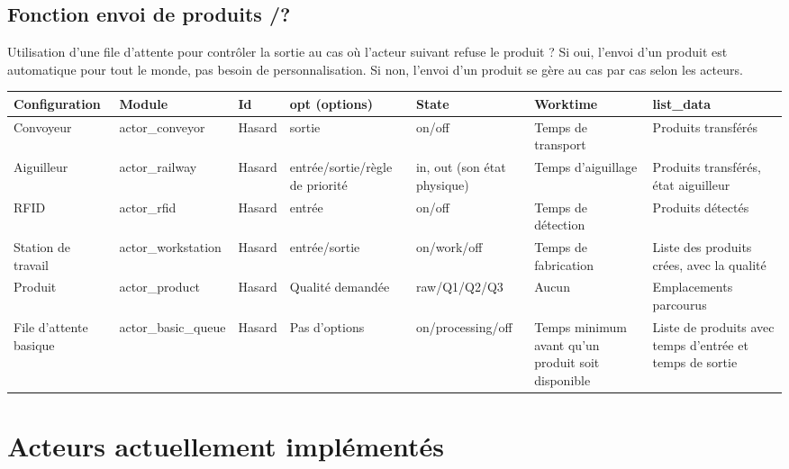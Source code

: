\documentclass[12pt,a4paper]{article}
\begin{document}
	\subsection*{Fonction envoi de produits /?}
		Utilisation d'une file d'attente pour contrôler la sortie au cas où
		l'acteur suivant refuse le produit ? 
		Si oui, l'envoi d'un produit est automatique pour tout le monde, pas
		besoin de personnalisation.
		Si non, l'envoi d'un produit se gère au cas par cas selon les acteurs.
	 
	\begin{landscape}
		\begin{center}
			\begin{tabularx}{1.55\textwidth}{|X|X|X|X|X|X|X|}
				\hline
				Configuration & 
				Module & 
				Id & 
				opt (options) & 
				State & 
				Worktime & 
				list\_data \\
				\hline
				Convoyeur & 
				actor\_conveyor & 
				Hasard & 
				sortie & 
				on/off & 
				Temps de transport & 
				Produits transférés \\
				\hline
				Aiguilleur & 
				actor\_railway & 
				Hasard & 
				entrée/sortie/règle de priorité & 
				{in, out} (son état physique) & 
				Temps d'aiguillage & 
				Produits transférés, état aiguilleur \\
				\hline
				RFID & 
				actor\_rfid & 
				Hasard & 
				entrée & 
				on/off & 
				Temps de détection & 
				Produits détectés\\
				\hline
				Station de travail & 
				actor\_workstation & 
				Hasard & 
				entrée/sortie & 
				on/work/off & 
				Temps de fabrication & 
				Liste des produits crées, avec la qualité \\
				\hline
				Produit & 
				actor\_product & 
				Hasard & 
				Qualité demandée & 
				raw/Q1/Q2/Q3 & 
				Aucun & 
				Emplacements parcourus \\
				\hline
				File d'attente basique & 
				actor\_basic\_queue & 
				Hasard & 
				Pas d'options & 
				on/processing/off & 
				Temps minimum avant qu'un produit soit disponible & 
				Liste de produits avec temps d'entrée et temps de sortie \\
				\hline
			\end{tabularx}
		\end{center}
	
	\end{landscape}

	\section{Acteurs actuellement implémentés}
	
\end{document}
